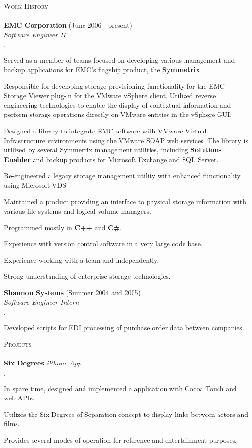 \documentclass[11pt]{article}
\newcommand{\mydot}{$\cdot$ }
\newcommand{\lineunder}{\vspace*{-8pt} \\ \hspace*{-18pt} \hrulefill \\}
\newcommand{\header}[1]{{\hspace*{-15pt}\vspace*{6pt} \textsc{#1}} \vspace*{-6pt} \lineunder}
\newcommand{\employer}[3]{\textbf{#1} (#2)\\ \emph{#3}\\  }
\newcommand{\project}[2]{\textbf{#1} \emph{#2}\\  }
\newenvironment{achievements}{\begin{list}{\mydot}{\topsep 0pt \itemsep -2pt}}{\vspace*{4pt}\end{list}}
\begin{document}
\header{Work History}
\employer{EMC Corporation}{June 2006 - present}{Software Engineer II}
\begin{achievements}
  \item Served as a member of teams focused on developing various management and backup applications for EMC's flagship product, the \textbf{Symmetrix}.
  \item Responsible for developing storage provisioning functionality for the EMC Storage Viewer plug-in for the VMware vSphere client.  Utilized reverse engineering technologies to enable the display of contextual information and perform storage operations directly on VMware entities in the vSphere GUI.
  \item Designed a library to integrate EMC software with VMware Virtual Infrastructure environments using the VMware SOAP web services.  The library is utilized by several Symmetrix management utilities, including \textbf{Solutions Enabler} and backup products for Microsoft Exchange and SQL Server.
  \item Re-engineered a legacy storage management utility with enhanced functionality using Microsoft VDS.
  \item Maintained a product providing an interface to physical storage information with various file systems and logical volume managers.
  \item Programmed mostly in \textbf{C++} and \textbf{C\#}.
  \item Experience with version control software in a very large code base.
  \item Experience working with a team and independently.
  \item Strong understanding of enterprise storage technologies.
\end{achievements}

\employer{Shannon Systems}{Summer 2004 and 2005}{Software Engineer Intern}
\begin{achievements}
  \item Developed scripts for EDI processing of purchase order data between companies.
\end{achievements}


\header{Projects}
\project{Six Degrees}{iPhone App}{
\begin{achievements}
  \item In spare time, designed and implemented a application with Cocoa Touch and web APIs.
  \item Utilizes the Six Degrees of Separation concept to display links between actors and films.
  \item Provides several modes of operation for reference and entertainment purposes.
\end{achievements}}
\end{document}
